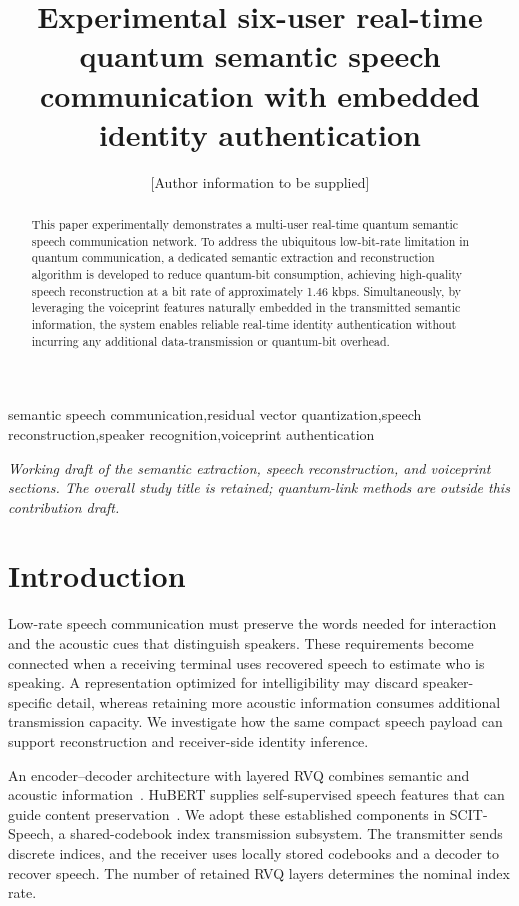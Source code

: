 \documentclass[final,5p,times,twocolumn]{elsarticle}
\begin{document}
\begin{frontmatter}
\title{Experimental six-user real-time quantum semantic speech communication with embedded identity authentication}
\author{[Author information to be supplied]}
\begin{abstract}
This paper experimentally demonstrates a multi-user real-time quantum semantic speech communication network. To address the ubiquitous low-bit-rate limitation in quantum communication, a dedicated semantic extraction and reconstruction algorithm is developed to reduce quantum-bit consumption, achieving high-quality speech reconstruction at a bit rate of approximately 1.46 kbps. Simultaneously, by leveraging the voiceprint features naturally embedded in the transmitted semantic information, the system enables reliable real-time identity authentication without incurring any additional data-transmission or quantum-bit overhead.
\end{abstract}
\begin{keyword}
semantic speech communication\sep residual vector quantization\sep speech reconstruction\sep speaker recognition\sep voiceprint authentication
\end{keyword}
\end{frontmatter}

\noindent\textit{Working draft of the semantic extraction, speech reconstruction, and voiceprint sections. The overall study title is retained; quantum-link methods are outside this contribution draft.}

\section{Introduction}
Low-rate speech communication must preserve the words needed for interaction and the acoustic cues that distinguish speakers. These requirements become connected when a receiving terminal uses recovered speech to estimate who is speaking. A representation optimized for intelligibility may discard speaker-specific detail, whereas retaining more acoustic information consumes additional transmission capacity. We investigate how the same compact speech payload can support reconstruction and receiver-side identity inference.

An encoder--decoder architecture with layered RVQ combines semantic and acoustic information~\cite{speechtokenizer}. HuBERT supplies self-supervised speech features that can guide content preservation~\cite{hubert}. We adopt these established components in SCIT-Speech, a shared-codebook index transmission subsystem. The transmitter sends discrete indices, and the receiver uses locally stored codebooks and a decoder to recover speech. The number of retained RVQ layers determines the nominal index rate.
\end{document}
